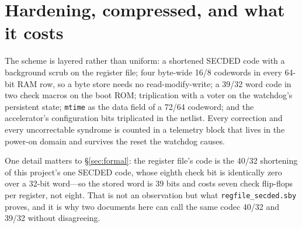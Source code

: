 \documentclass[11pt,a4paper]{article}
\newcommand{\file}[1]{\texttt{\small #1}}
\begin{document}
\section{Hardening, compressed, and what it costs}
\label{sec:harden}

The scheme is layered rather than uniform: a shortened SECDED code with
a background scrub on the register file; four byte-wide
\num{16}/\num{8} codewords in every \num{64}-bit RAM row, so a byte
store needs no read-modify-write; a \num{39}/\num{32} word code in two
check macros on the boot ROM; triplication with a voter on the
watchdog's persistent state; \texttt{mtime} as the data field of a
\num{72}/\num{64} codeword; and the accelerator's configuration bits
triplicated in the netlist. Every correction and every uncorrectable
syndrome is counted in a telemetry block that lives in the power-on
domain and survives the reset the watchdog causes.

One detail matters to \S\ref{sec:formal}: the register file's code is
the \num{40}/\num{32} shortening of this project's one SECDED code,
whose eighth check bit is identically zero over a \num{32}-bit
word---so the stored word is \num{39} bits and costs seven check
flip-flops per register, not eight. That is not an observation but what
\file{regfile\_secded.sby} proves, and it is why two documents here can
call the same codec \num{40}/\num{32} and \num{39}/\num{32} without
disagreeing.
\end{document}
